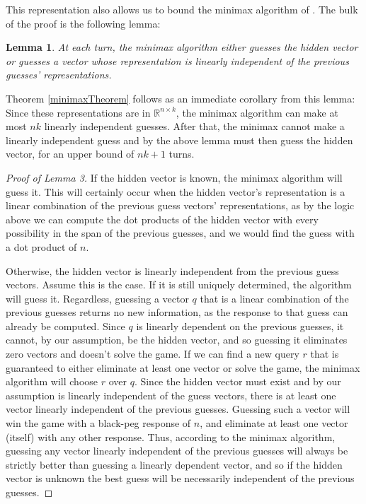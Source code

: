 \documentclass[12pt, a4paper]{article}
\newcommand{\R}{\mathbb{R}}           %
\newtheorem{lemma}{Lemma}
\begin{document}
This representation also allows us to bound the minimax algorithm of \cite{DK76}. The bulk of the proof is the following lemma:
\begin{lemma}
	At each turn, the minimax algorithm either guesses the hidden vector or guesses a vector whose representation is linearly independent of the previous guesses' representations.
\end{lemma}
Theorem \ref{minimaxTheorem} follows as an immediate corollary from this lemma: Since these representations are in $\R^{n \times k}$, the minimax algorithm can make at most $nk$ linearly independent guesses. After that, the minimax cannot make a linearly independent guess and by the above lemma must then guess the hidden vector, for an upper bound of $nk+1$ turns.
\begin{proof}[Proof of Lemma 3]
	If the hidden vector is known, the minimax algorithm will guess it. This will certainly occur when the hidden vector's representation is a linear combination of the previous guess vectors' representations, as by the logic above we can compute the dot products of the hidden vector with every possibility in the span of the previous guesses, and we would find the guess with a dot product of $n$.
	
	Otherwise, the hidden vector is linearly independent from the previous guess vectors. Assume this is the case. If it is still uniquely determined, the algorithm will guess it. Regardless, guessing a vector $q$ that is a linear combination of the previous guesses returns no new information, as the response to that guess can already be computed. Since $q$ is linearly dependent on the previous guesses, it cannot, by our assumption, be the hidden vector, and so guessing it eliminates zero vectors and doesn't solve the game. If we can find a new query $r$ that is guaranteed to either eliminate at least one vector or solve the game, the minimax algorithm will choose $r$ over $q$. Since the hidden vector must exist and by our assumption is linearly independent of the guess vectors, there is at least one vector linearly independent of the previous guesses. Guessing such a vector will win the game with a black-peg response of $n$, and eliminate at least one vector (itself) with any other response. Thus, according to the minimax algorithm, guessing any vector linearly independent of the previous guesses will always be strictly better than guessing a linearly dependent vector, and so if the hidden vector is unknown the best guess will be necessarily independent of the previous guesses.
\end{proof}
\end{document}
